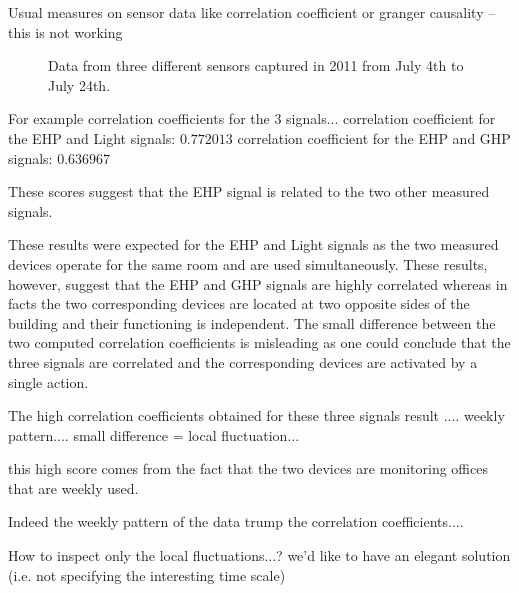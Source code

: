 Usual measures on sensor data like correlation coefficient or granger causality \cite{kim:buildsys2010}
-- this is not working


\begin{figure}
 \caption{Data from three different sensors captured in 2011 from July 4th to July 24th.}
 \label{fig:raw}
\end{figure}

For example correlation coefficients for the 3 signals...
correlation coefficient for the EHP and Light signals: $0.772013$
correlation coefficient for the EHP and GHP signals: $0.636967$

These scores suggest that the EHP signal is related to the two other measured signals.

These results were expected for the EHP and Light signals as the two measured devices operate for the same room and are used simultaneously.
These results, however, suggest that the EHP and GHP signals are highly correlated whereas in facts the two corresponding devices are located at two opposite sides of the building and their functioning is independent.
The small difference between the two computed correlation coefficients is misleading as one could conclude that the three signals are correlated and the corresponding devices are activated by a single action.

The high correlation coefficients obtained for these three signals result .... weekly pattern....
small difference = local fluctuation...

this high score comes from the fact that the two devices are monitoring offices that are weekly used.

Indeed the weekly pattern of the data trump the correlation coefficients....

How to inspect only the local fluctuations...?
we'd like to have an elegant solution (i.e. not specifying the interesting time scale)

